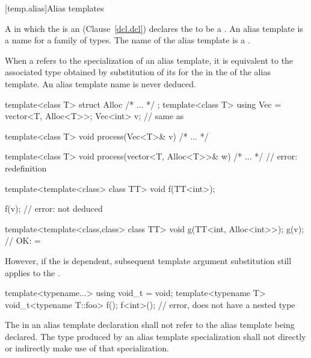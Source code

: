 [temp.alias]{Alias templates}

\pnum
A  in which the  is an
 (Clause~\ref{dcl.dcl}) declares the
 to be a .
An alias template is a name for a family of
types. The name of the alias template is a .

\pnum
When a  refers to the specialization of
an alias template, it is equivalent to the associated type obtained by
substitution of its  for the
 in the  of
the alias template.
\enternote An alias template name is never deduced.\exitnote
\enterexample

\begin{codeblock}
template<class T> struct Alloc { /* ... */ };
template<class T> using Vec = vector<T, Alloc<T>>;
Vec<int> v;         // same as 

template<class T>
  void process(Vec<T>& v)
  { /* ... */ }

template<class T>
  void process(vector<T, Alloc<T>>& w)
  { /* ... */ }     // error: redefinition

template<template<class> class TT>
  void f(TT<int>);

f(v);               // error:  not deduced

template<template<class,class> class TT>
  void g(TT<int, Alloc<int>>);
g(v);               // OK:  = 
\end{codeblock}

\exitexample

\pnum
However, if the  is dependent, subsequent template
argument substitution still applies to the .
\enterexample
\begin{codeblock}
template<typename...> using void_t = void;
template<typename T> void_t<typename T::foo> f();
f<int>(); // error,  does not have a nested type 
\end{codeblock}
\exitexample

\pnum
The  in an alias template declaration shall not refer to
the alias template being declared. The type produced by an alias template
specialization shall not directly or indirectly make use of that specialization.
\enterexample

